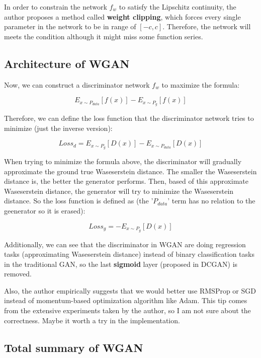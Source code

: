 \documentclass{article} %
\begin{document}
In order to constrain the network $f_w$ to satisfy the Lipschitz continuity, the author proposes a method called \textbf{weight clipping}, which forces every single parameter in the network to be in range of $[-c,c]$. Therefore, the network will meets the condition although it might miss some function series.

\subsection{Architecture of WGAN}

Now, we can construct a discriminator network $f_w$ to maximize the formula:

\begin{equation}
    E_{x \sim P_{data}}[f(x)]-E_{x \sim P_g}[f(x)]
\end{equation}

Therefore, we can define the loss function that the discriminator network tries to minimize (just the inverse version):

\begin{equation}
    Loss_d = E_{x \sim P_g}[D(x)]-E_{x \sim P_{data}}[D(x)]
\end{equation}

When trying to minimize the formula above, the discriminator will gradually approximate the ground true Waseserstein distance. The smaller the Waseserstein distance is, the better the generator performs. Then, based of this approximate Waseserstein distance, the generator will try to minimize the Waseserstein distance. So the loss function is defined as (the '$P_{data}$' term has no relation to the geenerator so it is erased):

\begin{equation}
    Loss_g = -E_{x \sim P_g}[D(x)]
\end{equation}

Additionally, we can see that the discriminator in WGAN are doing regression tasks (approximating Waseserstein distance) instead of binary classification tasks in the traditional GAN, so the last \textbf{sigmoid} layer (proposed in DCGAN) is removed.

Also, the author empirically suggests that we would better use RMSProp or SGD instead of momentum-based optimization algorithm like Adam. This tip comes from the extensive experiments taken by the author, so I am not sure about the correctness. Maybe it worth a try in the implementation.

\subsection{Total summary of WGAN}
\end{document}
